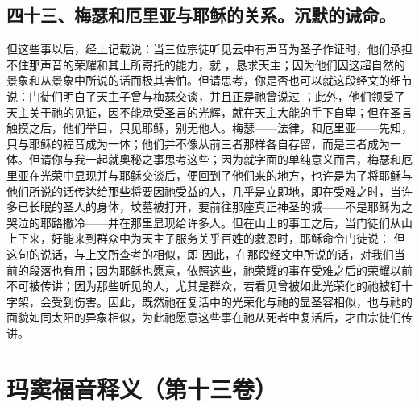 
\subsection{四十三、梅瑟和厄里亚与耶稣的关系。沉默的诫命。}

但这些事以后，经上记载说：当三位宗徒听见云中有声音为圣子作证时，他们承担不住那声音的荣耀和其上所寄托的能力，就 ，恳求天主；因为他们因这超自然的景象和从景象中所说的话而极其害怕。但请思考，你是否也可以就这段经文的细节说：门徒们明白了天主子曾与梅瑟交谈，并且正是祂曾说过 ；此外，他们领受了天主关于祂的见证，因不能承受圣言的光辉，就在天主大能的手下自卑；但在圣言触摸之后，他们举目，只见耶稣，别无他人。梅瑟——法律，和厄里亚——先知，只与耶稣的福音成为一体；他们并不像从前三者那样各自存留，而是三者成为一体。但请你与我一起就奥秘之事思考这些；因为就字面的单纯意义而言，梅瑟和厄里亚在光荣中显现并与耶稣交谈后，便回到了他们来的地方，也许是为了将耶稣与他们所说的话传达给那些将要因祂受益的人，几乎是立即地，即在受难之时，当许多已长眠的圣人的身体，坟墓被打开，要前往那座真正神圣的城——不是耶稣为之哭泣的耶路撒冷——并在那里显现给许多人。但在山上的事工之后，当门徒们从山上下来，好能来到群众中为天主子服务关乎百姓的救恩时，耶稣命令门徒说： 但这句的说话，与上文所查考的相似，即 因此，在那段经文中所说的话，对我们当前的段落也有用；因为耶稣也愿意，依照这些，祂荣耀的事在受难之后的荣耀以前不可被传讲；因为那些听见的人，尤其是群众，若看见曾被如此光荣化的祂被钉十字架，会受到伤害。因此，既然祂在复活中的光荣化与祂的显圣容相似，也与祂的面貌如同太阳的异象相似，为此祂愿意这些事在祂从死者中复活后，才由宗徒们传讲。\par



\section{玛窦福音释义（第十三卷）}

